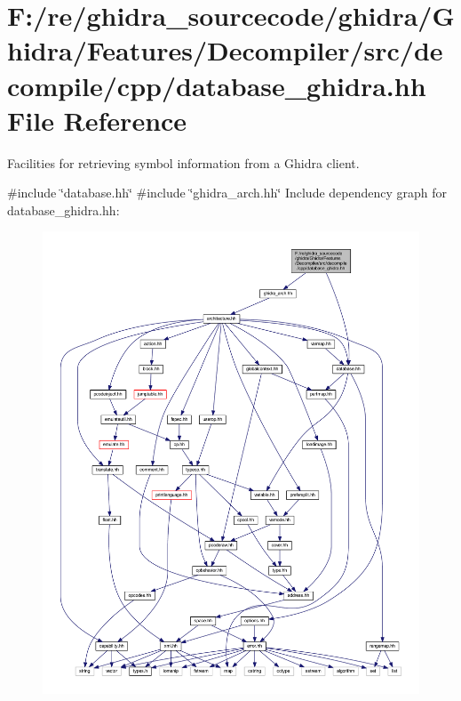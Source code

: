 \hypertarget{database__ghidra_8hh}{}\section{F\+:/re/ghidra\+\_\+sourcecode/ghidra/\+Ghidra/\+Features/\+Decompiler/src/decompile/cpp/database\+\_\+ghidra.hh File Reference}
\label{database__ghidra_8hh}


Facilities for retrieving symbol information from a Ghidra client.  


{\ttfamily \#include \char`\"{}database.\+hh\char`\"{}}\newline
{\ttfamily \#include \char`\"{}ghidra\+\_\+arch.\+hh\char`\"{}}\newline
Include dependency graph for database\+\_\+ghidra.\+hh\+:
\nopagebreak
\begin{figure}[H]
\begin{center}
\leavevmode
\includegraphics[width=350pt]{database__ghidra_8hh__incl}
\end{center}
\end{figure}
